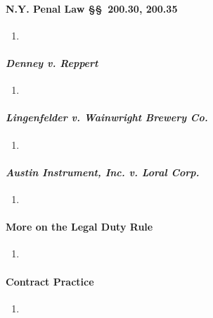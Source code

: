 \paragraph{N.Y. Penal Law \S\S\ 200.30, 200.35}

\begin{enumerate}
    \item %
\end{enumerate}

\paragraph{\emph{Denney v. Reppert}}

\begin{enumerate}
    \item %
\end{enumerate}

\paragraph{\emph{Lingenfelder v. Wainwright Brewery Co.}}

\begin{enumerate}
    \item %
\end{enumerate}

\paragraph{\emph{Austin Instrument, Inc. v. Loral Corp.}}

\begin{enumerate}
    \item %
\end{enumerate}

\paragraph{More on the Legal Duty Rule}

\begin{enumerate}
    \item %
\end{enumerate}

\paragraph{Contract Practice}

\begin{enumerate}
    \item %
\end{enumerate}

